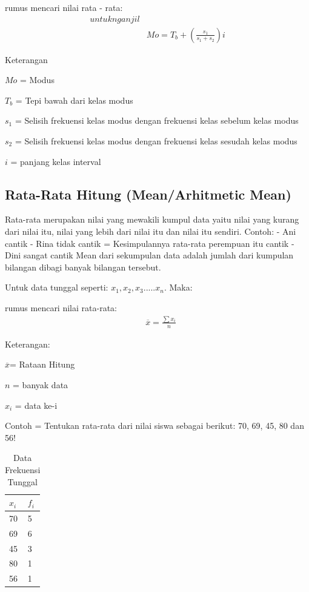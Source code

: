 \documentclass[11pt,fleqn]{book} %
\begin{document}
{\begin{theorem}[Mean]
rumus mencari nilai rata - rata:
\begin{align}
untuk n ganjil\\
& Mo = T_{b}+(\frac{s_{1}}{s_{1}+s_{2}})i
\end{align}
\end{theorem}

Keterangan 

$Mo$ = Modus

$T_{b}$ = Tepi bawah dari kelas modus

$s_{1}$ = Selisih frekuensi kelas modus dengan frekuensi kelas sebelum kelas modus

$s_{2}$ = Selisih frekuensi kelas modus dengan frekuensi kelas sesudah kelas modus

$i$ = panjang kelas interval

\subsection{Rata-Rata Hitung (Mean/Arhitmetic Mean)}

Rata-rata merupakan nilai yang mewakili kumpul data yaitu nilai yang kurang dari nilai itu, nilai yang lebih dari nilai itu dan nilai itu sendiri. 
Contoh:
-	Ani cantik
-	Rina tidak cantik		=      Kesimpulannya rata-rata perempuan itu cantik
-	Dini  sangat cantik          
Mean dari sekumpulan data adalah jumlah dari kumpulan bilangan dibagi banyak bilangan tersebut. 

Untuk data tunggal seperti: $x_{1}, x_{2}, x_{3}.....x_{n} $. Maka:

\begin{theorem}[Mean]
rumus mencari nilai rata-rata:
\begin{align}
& \overline{x} = \frac{\sum x_{i}}{n}
\end{align}
\end{theorem}

Keterangan:
	 
$\overline{x}$= Rataan Hitung
		 
$n$ = banyak data 

$x_{i}$ = data ke-i

Contoh = Tentukan rata-rata dari nilai siswa sebagai berikut: 70, 69, 45, 80 dan 56!

\begin{table}[h]
\centering
\begin{tabular}{l l}
\toprule
\textbf{$x_{i}$} & \textbf{$f_{i}$}\\
\midrule
70 & 5 \\
69 & 6 \\
45 & 3 \\
80 & 1 \\
56 & 1 \\
\bottomrule
\end{tabular}
\caption{Data Frekuensi Tunggal}
\end{table}

}
\end{document}
